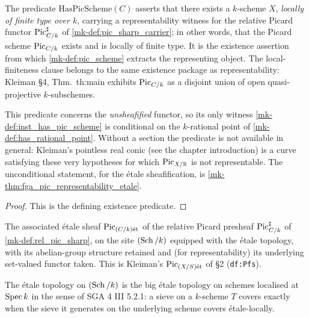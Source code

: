 \begin{definition}\label{mk-def:has_pic_scheme}
  \leanok

  The predicate \(\mathrm{HasPicScheme}(C)\) asserts that there exists a \(k\)-scheme
  \(X\), \emph{locally of finite type over \(k\)}, carrying a
  representability witness for the relative Picard functor
  \(\operatorname{Pic}^\sharp_{C/k}\) of \ref{mk-def:pic_sharp_carrier}; in other words,
  that the Picard scheme \(\operatorname{Pic}_{C/k}\) exists and is locally of finite
  type. It is the existence assertion from which \ref{mk-def:pic_scheme}
  extracts the representing object. The local-finiteness clause belongs to
  the same existence package as representability: Kleiman \S 4,
  Thm.~th:main exhibits \(\operatorname{Pic}_{C/k}\) as a disjoint union of open
  quasi-projective \(k\)-subschemes.

  This predicate concerns the \emph{unsheafified} functor, so its only witness
  \ref{mk-def:inst_has_pic_scheme} is conditional on the \(k\)-rational point of
  \ref{mk-def:has_rational_point}. Without a section the predicate is not available
  in general: Kleiman's pointless real conic (see the chapter introduction) is a
  curve satisfying these very hypotheses for which \(\operatorname{Pic}_{X/\mathbb{R}}\) is not
  representable. The unconditional statement, for the \'etale sheafification, is
  \ref{mk-thm:fga_pic_representability_etale}.
\end{definition}

\begin{proof}
  This is the defining existence predicate.
\end{proof}

\begin{definition}\label{mk-def:pic_et_sheaf}
  \leanok

  The associated \'etale sheaf \(\operatorname{Pic}_{(C/k)\mathrm{\acute{e}t}}\) of the relative Picard
  presheaf \(\operatorname{Pic}^\sharp_{C/k}\) of \ref{mk-def:rel_pic_sharp}, on the site
  \((\operatorname{Sch}/k)\) equipped with the \'etale topology, with its abelian-group
  structure retained and (for representability) its underlying set-valued
  functor taken. This is Kleiman's \(\operatorname{Pic}_{(X/S)\mathrm{\acute{e}t}}\) of \S 2 (\texttt{df:Pfs}).

  The \'etale topology on \((\operatorname{Sch}/k)\) is the big \'etale topology on schemes
  localised at \(\operatorname{Spec} k\) in the sense of SGA 4 III 5.2.1: a sieve on a
  \(k\)-scheme \(T\) covers exactly when the sieve it generates on the
  underlying scheme covers \'etale-locally.
\end{definition}


